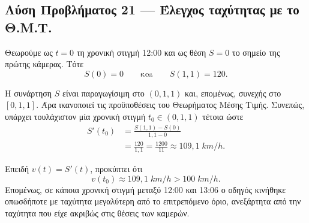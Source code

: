\subsection*{Λύση Προβλήματος 21 --- Έλεγχος ταχύτητας με το Θ.Μ.Τ.}

Θεωρούμε ως $t=0$ τη χρονική στιγμή 12:00 και ως θέση $S=0$ το σημείο
της πρώτης κάμερας. Τότε
\[
  S(0)=0
  \qquad\text{και}\qquad
  S(1{,}1)=120.
\]

Η συνάρτηση $S$ είναι παραγωγίσιμη στο $(0,1{,}1)$ και, επομένως,
συνεχής στο $[0,1{,}1]$. Άρα ικανοποιεί τις προϋποθέσεις του Θεωρήματος
Μέσης Τιμής. Συνεπώς, υπάρχει τουλάχιστον μία χρονική στιγμή
$t_0\in(0,1{,}1)$ τέτοια ώστε
\begin{align*}
  S'(t_0)
  &=\frac{S(1{,}1)-S(0)}{1{,}1-0}\\
  &=\frac{120}{1{,}1}
   =\frac{1200}{11}
   \approx109{,}1\;\si{km/h}.
\end{align*}

Επειδή $v(t)=S'(t)$, προκύπτει ότι
\[
  {v(t_0)\approx109{,}1\;\si{km/h}>100\;\si{km/h}}.
\]
Επομένως, σε κάποια χρονική στιγμή μεταξύ 12:00 και 13:06 ο οδηγός
κινήθηκε οπωσδήποτε με ταχύτητα μεγαλύτερη από το επιτρεπόμενο όριο,
ανεξάρτητα από την ταχύτητα που είχε ακριβώς στις θέσεις των καμερών.
